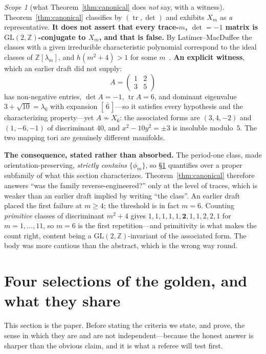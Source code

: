 \documentclass[11pt,reqno]{amsart}
\theoremstyle{plain}
\theoremstyle{definition}
\theoremstyle{remark}
\newtheorem{scope}[theorem]{Scope}
\newcommand{\Z}{\mathbb{Z}}
\newcommand{\GL}{\mathrm{GL}}
\newcommand{\tr}{\operatorname{tr}}
\begin{document}
\begin{scope}[what Theorem~\ref{thm:canonical} does \emph{not} say, with a witness]\label{sc:latimer}
Theorem~\ref{thm:canonical} classifies by $(\tr,\det)$ and exhibits $X_m$ as \emph{a}
representative. \textbf{It does not assert that every trace-$m$, $\det=-1$ matrix is
$\GL(2,\Z)$-conjugate to $X_m$, and that is false.} By Latimer--MacDuffee the classes
with a given irreducible characteristic polynomial correspond to the ideal classes of
$\Z[\lambda_m]$, and $h(m^2+4)>1$ for some $m$~\cite{LatimerMacDuffee}. \textbf{An explicit witness}, which an
earlier draft did not supply:
\[
   A=\begin{pmatrix}1&2\\3&5\end{pmatrix}
\]
has non-negative entries, $\det A=-1$, $\tr A=6$, and dominant eigenvalue
$3+\sqrt{10}=\lambda_6$ with expansion $[\,\overline{6}\,]$---so it satisfies every
hypothesis and the characterizing property---yet $A\not\sim X_6$: the associated forms
are $(3,4,-2)$ and $(1,-6,-1)$ of discriminant $40$, and $x^2-10y^2=\pm3$ is insoluble
modulo~$5$. The two mapping tori are genuinely different manifolds.

\textbf{The consequence, stated rather than absorbed.} The period-one class, made
orientation-preserving, \emph{strictly contains} $\{\phi_m\}$, so \S\ref{sec:four}
quantifies over a proper subfamily of what this section characterizes.
Theorem~\ref{thm:canonical} therefore answers ``was the family reverse-engineered?''
only at the level of traces, which is weaker than an earlier draft implied by writing
``the class''. An earlier draft placed the first failure at $m\ge4$; the threshold is in fact
$m=6$. Counting \emph{primitive} classes of discriminant $m^2+4$ gives
$1,1,1,1,1,\mathbf{2},1,1,2,2,1$ for $m=1,\dots,11$, so $m=6$ is the first
repetition---and primitivity is what makes the count right, content being a
$\GL(2,\Z)$-invariant of the associated form. The body was more cautious than the
abstract, which is the wrong way round.
\end{scope}

\section{Four selections of the golden, and what they share}\label{sec:four}

This section is the paper. Before stating the criteria we state, and prove, the sense in
which they are and are not independent---because the honest answer is sharper than the
obvious claim, and it is what a referee will test first.
\end{document}
